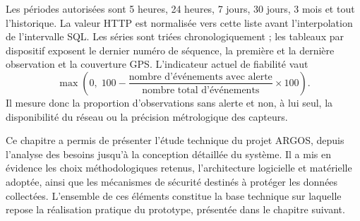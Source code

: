 Les périodes autorisées sont 5 heures, 24 heures, 7 jours, 30 jours, 3 mois
et tout l'historique. La valeur HTTP est normalisée vers cette liste avant
l'interpolation de l'intervalle SQL. Les séries sont triées chronologiquement ;
les tableaux par dispositif exposent le dernier numéro de séquence, la
première et la dernière observation et la couverture GPS. L'indicateur actuel
de fiabilité vaut
\[
\max\!\left(0,\;100-\frac{\text{nombre d'événements avec alerte}}
{\text{nombre total d'événements}}\times100\right).
\]
Il mesure donc la proportion d'observations sans alerte et non, à lui seul,
la disponibilité du réseau ou la précision métrologique des capteurs.


Ce chapitre a permis de présenter l'étude technique du projet ARGOS, depuis l'analyse des besoins jusqu'à la conception détaillée du système. Il a mis en évidence les choix méthodologiques retenus, l'architecture logicielle et matérielle adoptée, ainsi que les mécanismes de sécurité destinés à protéger les données collectées. L'ensemble de ces éléments constitue la base technique sur laquelle repose la réalisation pratique du prototype, présentée dans le chapitre suivant.

